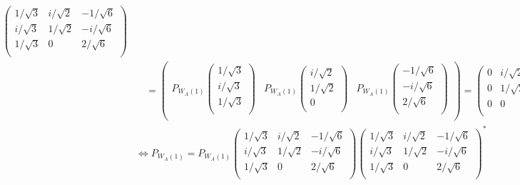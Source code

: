 \documentclass[dvipdfmx]{jsarticle}
\begin{document}
\begin{align*}
\begin{pmatrix}
{1}/{\sqrt{3}} & {i}/{\sqrt{2}} & - {1}/{\sqrt{6}} \\
{i}/{\sqrt{3}} & {1}/{\sqrt{2}} & - {i}/{\sqrt{6}} \\
{1}/{\sqrt{3}} & 0 & {2}/{\sqrt{6}} \\
\end{pmatrix} \\
&\quad = \begin{pmatrix}
P_{W_{A}(1)}\begin{pmatrix}
{1}/{\sqrt{3}} \\
{i}/{\sqrt{3}} \\
{1}/{\sqrt{3}} \\
\end{pmatrix} & P_{W_{A}(1)}\begin{pmatrix}
{i}/{\sqrt{2}} \\
{1}/{\sqrt{2}} \\
0 \\
\end{pmatrix} & P_{W_{A}(1)}\begin{pmatrix}
 - {1}/{\sqrt{6}} \\
 - {i}/{\sqrt{6}} \\
{2}/{\sqrt{6}} \\
\end{pmatrix} \\
\end{pmatrix} = \begin{pmatrix}
0 & {i}/{\sqrt{2}} & - {1}/{\sqrt{6}} \\
0 & {1}/{\sqrt{2}} & - {i}/{\sqrt{6}} \\
0 & 0 & {2}/{\sqrt{6}} \\
\end{pmatrix}\\
&\Leftrightarrow P_{W_{A}(1)} = P_{W_{A}(1)}\begin{pmatrix}
{1}/{\sqrt{3}} & {i}/{\sqrt{2}} & - {1}/{\sqrt{6}} \\
{i}/{\sqrt{3}} & {1}/{\sqrt{2}} & - {i}/{\sqrt{6}} \\
{1}/{\sqrt{3}} & 0 & {2}/{\sqrt{6}} \\
\end{pmatrix}\begin{pmatrix}
{1}/{\sqrt{3}} & {i}/{\sqrt{2}} & - {1}/{\sqrt{6}} \\
{i}/{\sqrt{3}} & {1}/{\sqrt{2}} & - {i}/{\sqrt{6}} \\
{1}/{\sqrt{3}} & 0 & {2}/{\sqrt{6}} \\
\end{pmatrix}^{*} \\

\end{align*}
\end{document}
